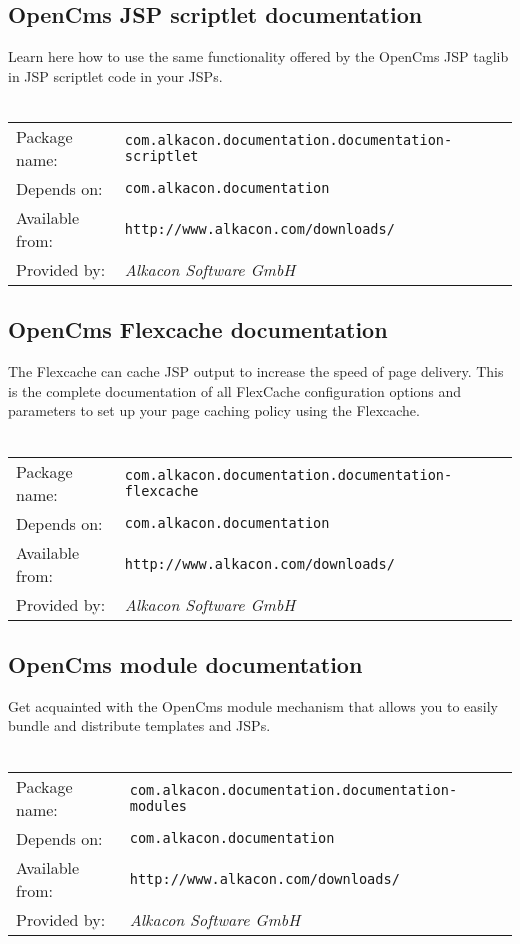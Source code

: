 \subsection{OpenCms JSP scriptlet documentation}
Learn here how to use the same functionality offered by the OpenCms JSP taglib in JSP scriptlet 
code in your JSPs.
\\
\\
\begin{tabular}{ll}
Package name: & {\tt com.alkacon.documentation.documentation-scriptlet}\\
Depends on: & {\tt com.alkacon.documentation}\\
Available from: & {\tt http://www.alkacon.com/downloads/}\\
Provided by: & {\em Alkacon Software GmbH}\\
\end{tabular}

\subsection{OpenCms Flexcache documentation}
The Flexcache can cache JSP output to increase the speed of page delivery. This is the complete 
documentation of all FlexCache configuration options and parameters to set up your page caching 
policy using the Flexcache.
\\
\\
\begin{tabular}{ll}
Package name: & {\tt com.alkacon.documentation.documentation-flexcache}\\
Depends on: & {\tt com.alkacon.documentation}\\
Available from: & {\tt http://www.alkacon.com/downloads/}\\
Provided by: & {\em Alkacon Software GmbH}\\
\end{tabular}

\subsection{OpenCms module documentation}
Get acquainted with the OpenCms module mechanism that allows you to easily bundle and distribute 
templates and JSPs.
\\
\\
\begin{tabular}{ll}
Package name: & {\tt com.alkacon.documentation.documentation-modules}\\
Depends on: & {\tt com.alkacon.documentation}\\
Available from: & {\tt http://www.alkacon.com/downloads/}\\
Provided by: & {\em Alkacon Software GmbH}\\
\end{tabular}

